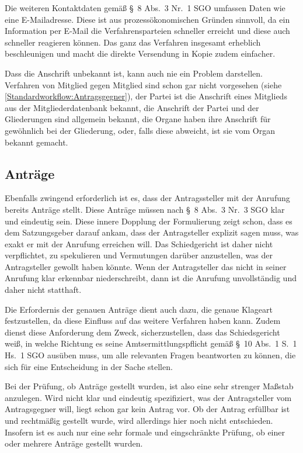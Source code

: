 Die weiteren Kontaktdaten gemäß \S~8 Abs.~3 Nr.~1 SGO umfassen Daten wie eine E-Mailadresse. Diese ist aus prozessökonomischen Gründen sinnvoll, da ein Information per E-Mail die Verfahrensparteien schneller erreicht und diese auch schneller reagieren können. Das ganz das Verfahren insgesamt erheblich beschleunigen und macht die direkte Versendung in Kopie zudem einfacher.

Dass die Anschrift unbekannt ist, kann auch nie ein Problem darstellen. Verfahren von Mitglied gegen Mitglied sind schon gar nicht vorgesehen (siehe \ref{Standardworkflow:Antragsgegner}), der Partei ist die Anschrift eines Mitglieds aus der Mitgliederdatenbank bekannt, die Anschrift der Partei und der Gliederungen sind allgemein bekannt, die Organe haben ihre Anschrift für gewöhnlich bei der Gliederung, oder, falls diese abweicht, ist sie vom Organ bekannt gemacht.

\subsection{Anträge}
\label{Standardworkflow:Antraege}
Ebenfalls zwingend erforderlich ist es, dass der Antragssteller mit der Anrufung bereits Anträge stellt.
Diese Anträge müssen nach \S~8 Abs.~3 Nr.~3 SGO klar und eindeutig sein.
Diese innere Dopplung der Formulierung zeigt schon, dass es dem Satzungsgeber darauf ankam, dass der Antragsteller explizit sagen muss, was exakt er mit der Anrufung erreichen will.
Das Schiedgericht ist daher nicht verpflichtet, zu spekulieren und Vermutungen darüber anzustellen, was der Antragsteller gewollt haben könnte. 
Wenn der Antragsteller das nicht in seiner Anrufung klar erkennbar niederschreibt, dann ist die Anrufung unvollständig und daher nicht statthaft.

Die Erfordernis der genauen Anträge dient auch dazu, die genaue Klageart festzustellen, da diese Einfluss auf das weitere Verfahren haben kann.
Zudem dienst diese Anforderung dem Zweck, sicherzustellen, dass das Schiedsgericht weiß, in welche Richtung es seine Amtsermittlungspflicht gemäß \S~10 Abs.~1 S.~1 Hs.~1 SGO ausüben muss, um alle relevanten Fragen beantworten zu können, die sich für eine Entscheidung in der Sache stellen.

Bei der Prüfung, ob Anträge gestellt wurden, ist also eine sehr strenger Maßstab anzulegen. Wird nicht klar und eindeutig spezifiziert, was der Antragsteller vom Antragsgegner will, liegt schon gar kein Antrag vor.
Ob der Antrag erfüllbar ist und rechtmäßig gestellt wurde, wird allerdings hier noch nicht entschieden.
Insofern ist es auch nur eine sehr formale und eingschränkte Prüfung, ob einer oder mehrere Anträge gestellt wurden.

